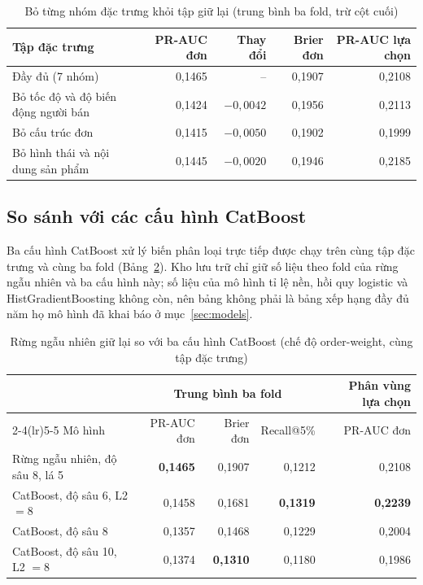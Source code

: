 \documentclass[12pt,a4paper]{report}
\begin{document}
\begin{table}[htbp]\centering\small
\caption{Bỏ từng nhóm đặc trưng khỏi tập giữ lại (trung bình ba fold, trừ cột cuối)}\label{tab:res-loo}
\begin{tabular}{p{5.6cm}rrrr}
\toprule
Tập đặc trưng & PR-AUC đơn & Thay đổi & Brier đơn & PR-AUC lựa chọn \\
\midrule
Đầy đủ (7 nhóm) & 0,1465 & -- & 0,1907 & 0,2108 \\
Bỏ tốc độ và độ biến động người bán & 0,1424 & $-0{,}0042$ & 0,1956 & 0,2113 \\
Bỏ cấu trúc đơn & 0,1415 & $-0{,}0050$ & 0,1902 & 0,1999 \\
Bỏ hình thái và nội dung sản phẩm & 0,1445 & $-0{,}0020$ & 0,1946 & 0,2185 \\
\bottomrule
\end{tabular}
\end{table}

\subsection{So sánh với các cấu hình CatBoost}\label{subsec:tab-catboost}

Ba cấu hình CatBoost xử lý biến phân loại trực tiếp được chạy trên cùng tập đặc trưng và cùng ba fold (Bảng~\ref{tab:res-catboost}). Kho lưu trữ chỉ giữ số liệu theo fold của rừng ngẫu nhiên và ba cấu hình này; số liệu của mô hình tỉ lệ nền, hồi quy logistic và HistGradientBoosting không còn, nên bảng không phải là bảng xếp hạng đầy đủ năm họ mô hình đã khai báo ở mục~\ref{sec:models}.

\begin{table}[htbp]\centering\small
\caption{Rừng ngẫu nhiên giữ lại so với ba cấu hình CatBoost (chế độ order-weight, cùng tập đặc trưng)}\label{tab:res-catboost}
\begin{tabular}{lrrrr}
\toprule
& \multicolumn{3}{c}{Trung bình ba fold} & Phân vùng lựa chọn \\
\cmidrule(lr){2-4}\cmidrule(lr){5-5}
Mô hình & PR-AUC đơn & Brier đơn & Recall@5\% & PR-AUC đơn \\
\midrule
Rừng ngẫu nhiên, độ sâu 8, lá 5 & \textbf{0,1465} & 0,1907 & 0,1212 & 0,2108 \\
CatBoost, độ sâu 6, L2 $=8$ & 0,1458 & 0,1681 & \textbf{0,1319} & \textbf{0,2239} \\
CatBoost, độ sâu 8 & 0,1357 & 0,1468 & 0,1229 & 0,2004 \\
CatBoost, độ sâu 10, L2 $=8$ & 0,1374 & \textbf{0,1310} & 0,1180 & 0,1986 \\
\bottomrule
\end{tabular}
\end{table}
\end{document}
